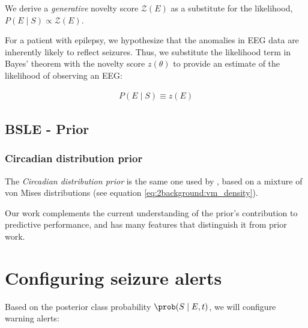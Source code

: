 



We derive a \emph{generative} novelty score $\mathcal{Z}(E)$ as a substitute for the likelihood, $P(E \mid S) \propto \mathcal{Z}(E)$.


For a patient with epilepsy, we hypothesize that the anomalies in EEG data are inherently likely to reflect seizures. Thus, we substitute the likelihood term in Bayes' theorem with the novelty score $z(\theta)$ to provide an estimate of the likelihood of observing an EEG:

\begin{align}
    P(E \mid S) \equiv z(E)
\end{align}

\subsection{BSLE - Prior}

\subsubsection{Circadian distribution prior}
The \emph{Circadian distribution prior} is the same one used by \citet{karoly2017circadian}, based on a mixture of von Mises distributions (see equation \ref{eq:2background:vm_density}).

Our work complements the current understanding of the prior's contribution to predictive performance, and has many features that distinguish it from prior work.


\section{Configuring seizure alerts}

Based on the posterior class probability $\prob(S \mid E, t)$, we will configure warning alerts:


